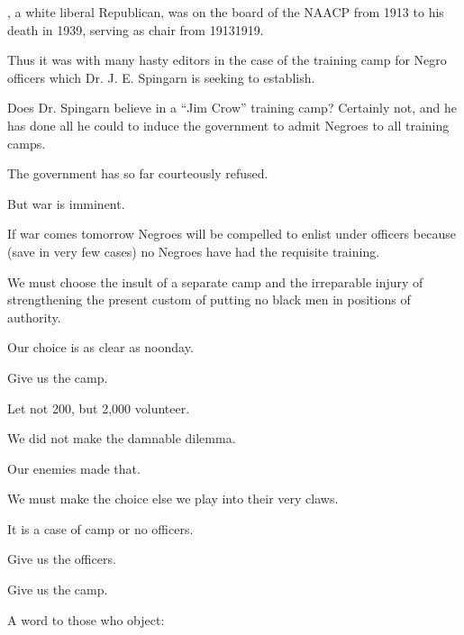 \documentclass[letterpaper,10pt,english]{jupyterBook}
\begin{document}
\begin{sphinxShadowBox}
\sphinxstylesidebartitle{}

\sphinxAtStartPar
{}, a white liberal Republican, was on the board of the NAACP from 1913 to his death in 1939, serving as chair from 1913\sphinxhyphen{}1919.
\end{sphinxShadowBox}

\sphinxAtStartPar
Thus it was with many hasty edi­tors in the case of the training camp for Negro officers which Dr. J. E. Spingarn is seeking to establish.

\sphinxAtStartPar
Does Dr. Spingarn believe in a “Jim Crow” training camp? Certainly not, and he has done all he could to induce the government to admit Negroes to all training camps.

\sphinxAtStartPar
The government has so far courteously refused.

\sphinxAtStartPar
But war is imminent.

\sphinxAtStartPar
If war comes to\sphinxhyphen{}morrow Negroes will be compelled to enlist under  officers because (save in very few cases) no Negroes have had the requisite training.

\sphinxAtStartPar
We must choose the insult of a separate camp and the irreparable injury of strengthening the present custom of putting no black men in positions of authority.

\sphinxAtStartPar
Our choice is as clear as noonday.

\sphinxAtStartPar
Give us the camp.

\sphinxAtStartPar
Let not 200, but 2,000 volunteer.

\sphinxAtStartPar
We did not make the damnable dilemma.

\sphinxAtStartPar
Our enemies made that.

\sphinxAtStartPar
We must make the choice else we play into their very claws.

\sphinxAtStartPar
It is a case of camp or no officers.

\sphinxAtStartPar
Give us the officers.

\sphinxAtStartPar
Give us the camp.

\sphinxAtStartPar
A word to those who object:
\end{document}
